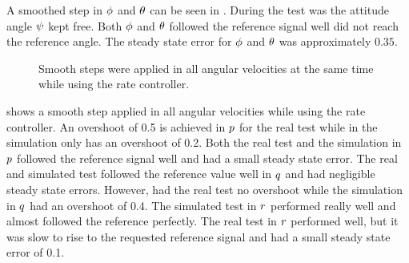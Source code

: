A smoothed step in $\phi$ and $\theta$ can be seen in . During the test was the attitude angle $\psi$ kept free. Both $\phi$ and $\theta$ followed the reference signal well did not reach the reference angle. The steady state error for $\phi$ and $\theta$ was approximately $0.35$.

\begin{figure}
\centering
  \qquad
  \qquad
  \qquad
  \qquad
  \qquad
  \caption{\label{fig:StepAllRate}%
  Smooth steps were applied in all angular velocities at the same time while using the rate controller.}
\end{figure}

 shows a smooth step applied in all angular velocities while using the rate controller. An overshoot of 0.5 is achieved in $p$ for the real test while in the simulation only has an overshoot of 0.2. Both the real test and the simulation in $p$ followed the reference signal well and had a small steady state error. The real and simulated test followed the reference value well in $q$ and had negligible steady state errors. However, had the real test no overshoot while the simulation in $q$ had an overshoot of 0.4. The simulated test in $r$ performed really well and almost followed the reference perfectly. The real test in $r$ performed well, but it was slow to rise to the requested reference signal and had a small steady state error of 0.1. 

